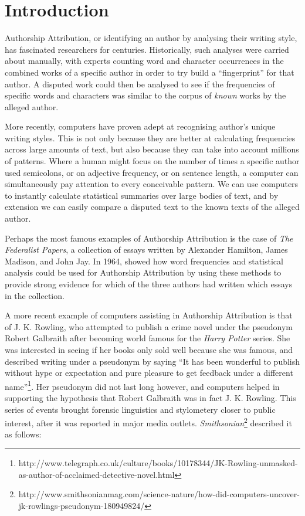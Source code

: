 \chapter{Introduction}
\label{chap:intro}

Authorship Attribution, or identifying an author by analysing their writing style, has fascinated researchers for centuries. Historically, such analyses were carried about manually, with experts counting word and character occurrences in the combined works of a specific author in order to try build a ``fingerprint'' for that author. A disputed work could then be analysed to see if the frequencies of specific words and characters was similar to the corpus of \textit{known} works by the alleged author. 

More recently, computers have proven adept at recognising author's unique writing styles. This is not only because they are better at calculating frequencies across large amounts of text, but also because they can take into account millions of patterns. Where a human might focus on the number of times a specific author used semicolons, or on adjective frequency, or on sentence length, a computer can simultaneously pay attention to every conceivable pattern. We can use computers to instantly calculate statistical summaries over large bodies of text, and by extension we can easily compare a disputed text to the known texts of the alleged author.

Perhaps the most famous examples of Authorship Attribution is the case of \textit{The Federalist Papers}, a collection of essays written by Alexander Hamilton, James Madison, and John Jay. In 1964, \citet{mosteller2007inference} showed how word frequencies and statistical analysis could be used for Authorship Attribution by using these methods to provide strong evidence for which of the three authors had written which essays in the collection.

A more recent example of computers assisting in Authorship Attribution is that of J. K. Rowling, who attempted to publish a crime novel under the pseudonym Robert Galbraith after becoming world famous for the \textit{Harry Potter} series. She was interested in seeing if her books only sold well because she was famous, and described writing under a pseudonym by saying ``It has been wonderful to publish without hype or expectation and pure pleasure to get feedback under a different name''\footnote{http://www.telegraph.co.uk/culture/books/10178344/JK-Rowling-unmasked-as-author-of-acclaimed-detective-novel.html}. Her pseudonym did not last long however, and computers helped in supporting the hypothesis that Robert Galbraith was in fact J. K. Rowling. This series of events brought forensic linguistics and stylometery closer to public interest, after it was reported in major media outlets. \textit{Smithsonian}\footnote{http://www.smithsonianmag.com/science-nature/how-did-computers-uncover-jk-rowlings-pseudonym-180949824/} described it as follows:

